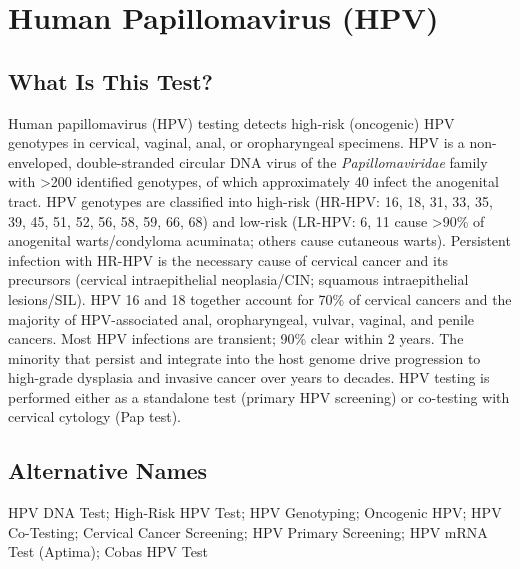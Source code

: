 \chapter{Human Papillomavirus (HPV)}

\section*{What Is This Test?}
Human papillomavirus (HPV) testing detects high-risk (oncogenic) HPV genotypes in cervical, vaginal, anal, or oropharyngeal specimens. HPV is a non-enveloped, double-stranded circular DNA virus of the \textit{Papillomaviridae} family with >200 identified genotypes, of which approximately 40 infect the anogenital tract. HPV genotypes are classified into high-risk (HR-HPV: 16, 18, 31, 33, 35, 39, 45, 51, 52, 56, 58, 59, 66, 68) and low-risk (LR-HPV: 6, 11 cause >90\% of anogenital warts/condyloma acuminata; others cause cutaneous warts). Persistent infection with HR-HPV is the necessary cause of cervical cancer and its precursors (cervical intraepithelial neoplasia/CIN; squamous intraepithelial lesions/SIL). HPV 16 and 18 together account for 70\% of cervical cancers and the majority of HPV-associated anal, oropharyngeal, vulvar, vaginal, and penile cancers. Most HPV infections are transient; 90\% clear within 2 years. The minority that persist and integrate into the host genome drive progression to high-grade dysplasia and invasive cancer over years to decades. HPV testing is performed either as a standalone test (primary HPV screening) or co-testing with cervical cytology (Pap test).

\section*{Alternative Names}
HPV DNA Test; High-Risk HPV Test; HPV Genotyping; Oncogenic HPV; HPV Co-Testing; Cervical Cancer Screening; HPV Primary Screening; HPV mRNA Test (Aptima); Cobas HPV Test

